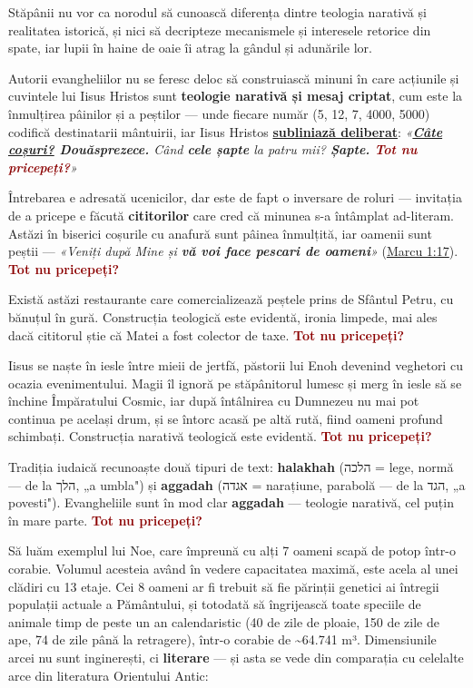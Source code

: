 \documentclass[12pt,a4paper,twoside,openany]{book}
\begin{document}
Stăpânii nu vor ca norodul să cunoască diferența dintre teologia narativă și realitatea istorică, și nici să decripteze mecanismele și interesele retorice din spate, iar lupii în haine de oaie îi atrag la gândul și adunările lor.

Autorii evangheliilor nu se feresc deloc să construiască minuni în care acțiunile și cuvintele lui Iisus Hristos sunt \textbf{teologie narativă și mesaj criptat}, cum este la înmulțirea pâinilor și a peștilor — unde fiecare număr (5, 12, 7, 4000, 5000) codifică destinatarii mântuirii, iar Iisus Hristos \textbf{\underline{subliniază deliberat}}: \textit{«\textbf{\underline{Câte coșuri?} Douăsprezece.} Când \textbf{cele șapte} la patru mii? \textbf{Șapte.} \textcolor{darkred}{\textbf{Tot nu pricepeți?}}»}

Întrebarea e adresată ucenicilor, dar este de fapt o inversare de roluri — invitația de a pricepe e făcută \textbf{cititorilor} care cred că minunea s-a întâmplat ad-literam. Astăzi în biserici coșurile cu anafură sunt pâinea înmulțită, iar oamenii sunt peștii — \textit{«Veniți după Mine și \textbf{vă voi face pescari de oameni}»} (\href{https://bibliaortodoxa.ro/carte.php?id=53\&cap=1\#17}{Marcu 1:17}). \textcolor{darkred}{\textbf{Tot nu pricepeți?}}

Există astăzi restaurante care comercializează peștele prins de Sfântul Petru, cu bănuțul în gură. Construcția teologică este evidentă, ironia limpede, mai ales dacă cititorul știe că Matei a fost colector de taxe. \textcolor{darkred}{\textbf{Tot nu pricepeți?}}

Iisus se naște în iesle între mieii de jertfă, păstorii lui Enoh devenind veghetori cu ocazia evenimentului. Magii îl ignoră pe stăpânitorul lumesc și merg în iesle să se închine Împăratului Cosmic, iar după întâlnirea cu Dumnezeu nu mai pot continua pe același drum, și se întorc acasă pe altă rută, fiind oameni profund schimbați. Construcția narativă teologică este evidentă. \textcolor{darkred}{\textbf{Tot nu pricepeți?}}

Tradiția iudaică recunoaște două tipuri de text: \textbf{halakhah} (הלכה = lege, normă — de la הלך, „a umbla") și \textbf{aggadah} (אגדה = narațiune, parabolă — de la הגד, „a povesti"). Evangheliile sunt în mod clar \textbf{aggadah} — teologie narativă, cel puțin în mare parte. \textcolor{darkred}{\textbf{Tot nu pricepeți?}}

Să luăm exemplul lui Noe, care împreună cu alți 7 oameni scapă de potop într-o corabie. Volumul acesteia având în vedere capacitatea maximă, este acela al unei clădiri cu 13 etaje. Cei 8 oameni ar fi trebuit să fie părinții genetici ai întregii populații actuale a Pământului, și totodată să îngrijească toate speciile de animale timp de peste un an calendaristic (40 de zile de ploaie, 150 de zile de ape, 74 de zile până la retragere), într-o corabie de \textasciitilde{}64.741 m³. Dimensiunile arcei nu sunt inginerești, ci \textbf{literare} — și asta se vede din comparația cu celelalte arce din literatura Orientului Antic:
\end{document}
